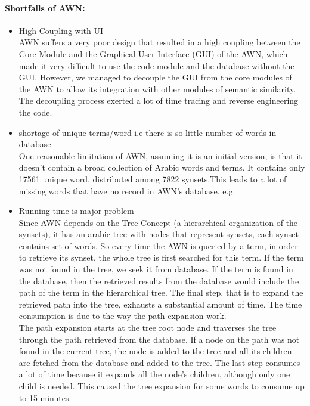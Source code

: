 \paragraph{Shortfalls of AWN:}
\begin{itemize}
\item High Coupling with UI\\
AWN suffers a very poor design that resulted in a high coupling between the Core Module and the Graphical User Interface (GUI) of the AWN, which made it very difficult to use the code module and the database without the GUI. However, we managed to decouple the GUI from the core modules of the AWN to allow its integration with other modules of semantic similarity. The decoupling process exerted a lot of time tracing and reverse engineering the code.
\item shortage of unique terms/word i.e there is so little number of words in database\\
       One reasonable limitation of AWN, assuming it is an initial version, is that it doesn’t contain a broad collection of Arabic words and terms. It contains only 17561 unique word, distributed among 7822 synsets.This leads to a lot of missing words that have no record in AWN’s database. e.g. 
\item Running time is major problem\\
Since AWN depends on the Tree Concept (a hierarchical organization of the synsets), it has an arabic tree with nodes that represent synsets, each synset contains set of words. So every time the AWN is queried by a term, in order to retrieve its synset, the whole tree is first searched for this term. If the term was not found in the tree, we seek it from database. If the term is found in the database, then the retrieved results from the database would include the path of the term in the hierarchical tree. The final step, that is to expand the retrieved path into the tree, exhausts a substantial amount of time. The time consumption is due to the way the path expansion work. \\
The path expansion starts at the tree root node and traverses the tree through the path retrieved from the database. If a node on the path was not found in the current tree, the node is added to the tree and all its children are fetched from the database and added to the tree. The last step consumes a lot of time because it expands all the node’s children, although only one child is needed. This caused the tree expansion for some words to consume up to 15 minutes.\\

\end{itemize}
